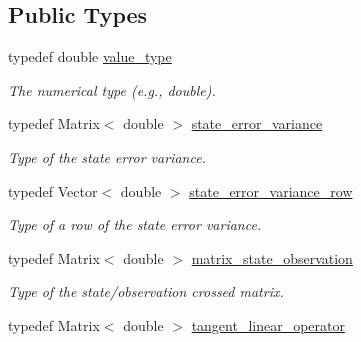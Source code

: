 \documentclass{tufte-book}
\begin{document}
\subsection{\-Public \-Types}
\begin{DoxyCompactItemize}
\item
\hypertarget{class_verdandi_1_1_model_template_ad7aa99fa36b5f4057adbd2b347e742d3}{
typedef double \hyperlink{class_verdandi_1_1_model_template_ad7aa99fa36b5f4057adbd2b347e742d3}{value\-\_\-type}}
\label{class_verdandi_1_1_model_template_ad7aa99fa36b5f4057adbd2b347e742d3}

\begin{DoxyCompactList}\small\item\em \-The numerical type (e.\-g., double). \end{DoxyCompactList}\item
\hypertarget{class_verdandi_1_1_model_template_a051aba295b633cc6d463ad1c5f998bc3}{
typedef \-Matrix$<$ double $>$ \hyperlink{class_verdandi_1_1_model_template_a051aba295b633cc6d463ad1c5f998bc3}{state\-\_\-error\-\_\-variance}}
\label{class_verdandi_1_1_model_template_a051aba295b633cc6d463ad1c5f998bc3}

\begin{DoxyCompactList}\small\item\em \-Type of the state error variance. \end{DoxyCompactList}\item
\hypertarget{class_verdandi_1_1_model_template_a01455126ac4fcc8b3218aad839d494bd}{
typedef \-Vector$<$ double $>$ \hyperlink{class_verdandi_1_1_model_template_a01455126ac4fcc8b3218aad839d494bd}{state\-\_\-error\-\_\-variance\-\_\-row}}
\label{class_verdandi_1_1_model_template_a01455126ac4fcc8b3218aad839d494bd}

\begin{DoxyCompactList}\small\item\em \-Type of a row of the state error variance. \end{DoxyCompactList}\item
\hypertarget{class_verdandi_1_1_model_template_a86766eaee9b075944260fed957cf5ac4}{
typedef \-Matrix$<$ double $>$ \hyperlink{class_verdandi_1_1_model_template_a86766eaee9b075944260fed957cf5ac4}{matrix\-\_\-state\-\_\-observation}}
\label{class_verdandi_1_1_model_template_a86766eaee9b075944260fed957cf5ac4}

\begin{DoxyCompactList}\small\item\em \-Type of the state/observation crossed matrix. \end{DoxyCompactList}\item
\hypertarget{class_verdandi_1_1_model_template_a014f883415120d5ba6655c710467a651}{
typedef \-Matrix$<$ double $>$ \hyperlink{class_verdandi_1_1_model_template_a014f883415120d5ba6655c710467a651}{tangent\-\_\-linear\-\_\-operator}}
\label{class_verdandi_1_1_model_template_a014f883415120d5ba6655c710467a651}


\end{DoxyCompactItemize}
\end{document}

